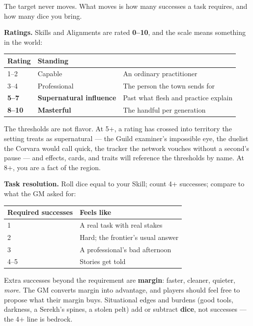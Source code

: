 The target never moves. What moves is how many successes a task requires, and how many dice you bring.

\textbf{Ratings.} Skills and Alignments are rated \textbf{0--10}, and the scale means something in the world:

\begin{center}
\begin{tabular}{lll}
\textbf{Rating} & \textbf{Standing} & \\
\hline
1--2 & Capable & An ordinary practitioner \\
3--4 & Professional & The person the town sends for \\
\textbf{5--7} & \textbf{Supernatural influence} & Past what flesh and practice explain \\
\textbf{8--10} & \textbf{Masterful} & The handful per generation \\
\end{tabular}
\end{center}

The thresholds are not flavor. At 5+, a rating has crossed into territory the setting treats as supernatural --- the Guild examiner's impossible eye, the duelist the Corvara would call quick, the tracker the network vouches without a second's pause --- and effects, cards, and traits will reference the thresholds by name. At 8+, you are a fact of the region.

\textbf{Task resolution.} Roll dice equal to your Skill; count 4+ successes; compare to what the GM asked for:

\begin{center}
\begin{tabular}{ll}
\textbf{Required successes} & \textbf{Feels like} \\
\hline
1 & A real task with real stakes \\
2 & Hard; the frontier's usual answer \\
3 & A professional's bad afternoon \\
4--5 & Stories get told \\
\end{tabular}
\end{center}

Extra successes beyond the requirement are \textbf{margin}: faster, cleaner, quieter, \textit{more}. The GM converts margin into advantage, and players should feel free to propose what their margin buys. Situational edges and burdens (good tools, darkness, a Serekh's spines, a stolen pelt) add or subtract \textbf{dice}, not successes --- the 4+ line is bedrock.

